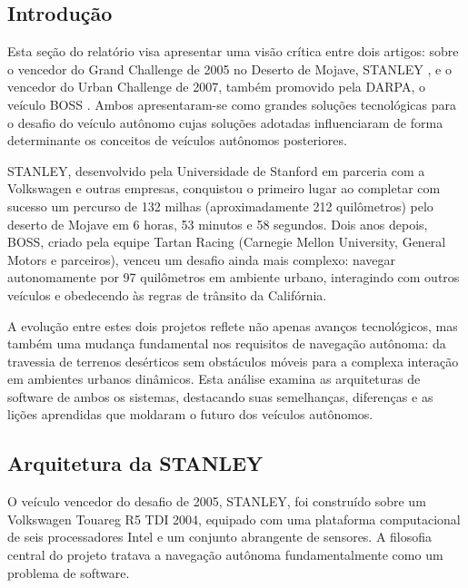 \subsection{Introdução}

Esta seção do relatório visa apresentar uma visão crítica entre dois artigos: sobre o vencedor do Grand Challenge de 2005 no Deserto de Mojave, STANLEY \cite{thrun2006stanley}, e o vencedor do Urban Challenge de 2007, também promovido pela DARPA, o veículo BOSS \cite{urmson2008autonomous}. Ambos apresentaram-se como grandes soluções tecnológicas para o desafio do veículo autônomo cujas soluções adotadas influenciaram de forma determinante os conceitos de veículos autônomos posteriores.

STANLEY, desenvolvido pela Universidade de Stanford em parceria com a Volkswagen e outras empresas, conquistou o primeiro lugar ao completar com sucesso um percurso de 132 milhas (aproximadamente 212 quilômetros) pelo deserto de Mojave em 6 horas, 53 minutos e 58 segundos. Dois anos depois, BOSS, criado pela equipe Tartan Racing (Carnegie Mellon University, General Motors e parceiros), venceu um desafio ainda mais complexo: navegar autonomamente por 97 quilômetros em ambiente urbano, interagindo com outros veículos e obedecendo às regras de trânsito da Califórnia.

A evolução entre estes dois projetos reflete não apenas avanços tecnológicos, mas também uma mudança fundamental nos requisitos de navegação autônoma: da travessia de terrenos desérticos sem obstáculos móveis para a complexa interação em ambientes urbanos dinâmicos. Esta análise examina as arquiteturas de software de ambos os sistemas, destacando suas semelhanças, diferenças e as lições aprendidas que moldaram o futuro dos veículos autônomos.

\subsection{Arquitetura da STANLEY}

O veículo vencedor do desafio de 2005, STANLEY, foi construído sobre um Volkswagen Touareg R5 TDI 2004, equipado com uma plataforma computacional de seis processadores Intel e um conjunto abrangente de sensores. A filosofia central do projeto tratava a navegação autônoma fundamentalmente como um problema de software.

